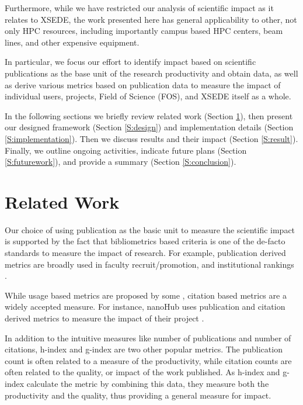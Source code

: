 \documentclass{sig-alternate}
\begin{document}
Furthermore, while we have restricted our analysis of scientific
impact as it relates to XSEDE, the work presented here has general
applicability to other, not only HPC resources, including importantly campus
based HPC centers, beam lines, and other expensive equipment.

In particular, we focus our effort to identify impact based on
scientific publications as the base unit of the research productivity
and obtain data, as well as derive various metrics based on publication
data to measure the impact of individual users, projects, Field of
Science (FOS), and XSEDE itself as a whole.

In the following sections we briefly review related
work (Section \ref{S:related}), then present our designed framework
(Section \ref{S:design}) and implementation details (Section
\ref{S:implementation}). Then we discuss results and their impact
(Section \ref{S:result}). Finally, we outline ongoing activities,
indicate future plans (Section \ref{S:futurework}), and provide a
summary (Section \ref{S:conclusion}).

\section{Related Work} \label{S:related}
 
Our choice of using publication as the basic unit to measure the
scientific impact is supported by the fact that bibliometrics based
criteria is one of the de-facto standards to measure the impact of
research. For example, publication derived metrics are broadly used in
faculty recruit/promotion, and institutional rankings
\cite{thomas1998institutional}.
 
While usage based metrics are proposed by some
\cite{Bollen:2007:MUM:1255175.1255273,Bollen:2008:TUI:1378889.1378928,
  bollen2009principal}, citation based metrics are a widely accepted
measure. For instance, nanoHub uses publication and citation derived
metrics to measure the impact of their project \cite{www-nanohubcite}.

In addition to the intuitive measures like number of publications and
number of citations, h-index \cite{hirsch2005index} and g-index
\cite{egghe2006theory} are two other popular metrics. The publication
count is often related to a measure of the productivity, while
citation counts are often related to the quality, or impact of the
work published. As h-index and g-index calculate the metric by
combining this data, they measure both the productivity and the
quality, thus providing a general measure for impact.
\end{document}
